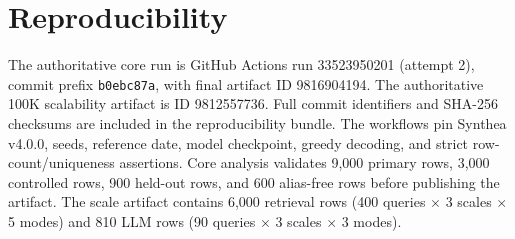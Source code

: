 \section{Reproducibility}
The authoritative core run is GitHub Actions run 33523950201 (attempt 2), commit prefix \texttt{b0ebc87a}, with final artifact ID 9816904194. The authoritative 100K scalability artifact is ID 9812557736. Full commit identifiers and SHA-256 checksums are included in the reproducibility bundle. The workflows pin Synthea v4.0.0, seeds, reference date, model checkpoint, greedy decoding, and strict row-count/uniqueness assertions. Core analysis validates 9,000 primary rows, 3,000 controlled rows, 900 held-out rows, and 600 alias-free rows before publishing the artifact. The scale artifact contains 6,000 retrieval rows (400 queries $\times$ 3 scales $\times$ 5 modes) and 810 LLM rows (90 queries $\times$ 3 scales $\times$ 3 modes).
